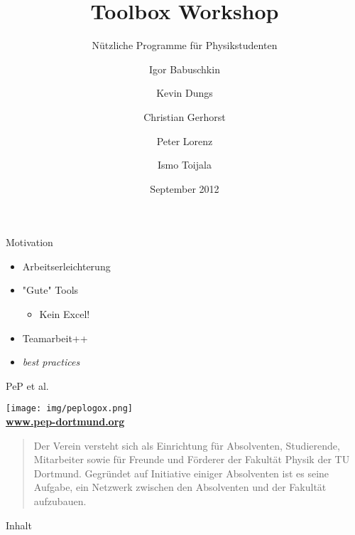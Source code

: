 \documentclass[t]{beamer}
\title{Toolbox Workshop}
\subtitle{Nützliche Programme für Physikstudenten}
\author[Igor B.\and Kevin D.\and Christian G.\and Peter L.\and Ismo T.]{
       Igor Babuschkin%
  \and Kevin Dungs%
  \and Christian Gerhorst%
  \and Peter Lorenz%
  \and Ismo Toijala%
}
\institute[PeP et al. e.V.]{PeP et al. e.V.\thanks{\href{http://pep-dortmund.org}{pep-dortmund.org}}}
\date{September 2012}
\begin{document}
  {
    \begin{frame}
      \titlepage
    \end{frame}
  }

  \begin{frame}{Motivation}
    \begin{itemize}
      \item Arbeitserleichterung
      \item "Gute" Tools \begin{itemize}
        \item Kein Excel!
      \end{itemize}
    \item Teamarbeit++
    \item \textit{best practices}
    \end{itemize}  
  \end{frame}

  \begin{frame}{PeP et al.}
    \begin{center}
      \texttt{[image: img/peplogox.png]} \\
      \color{TUgreen}\textbf{\href{http://pep-dortmund.org}{www.pep-dortmund.org}}
    \end{center}
    \begin{quote}
      \begin{spacing}{1.0}
        Der Verein versteht sich als Einrichtung für Absolventen, Studierende, Mitarbeiter sowie für Freunde und Förderer der Fakultät Physik der TU Dortmund. Gegründet auf Initiative einiger Absolventen ist es seine Aufgabe, ein Netzwerk zwischen den Absolventen und der Fakultät aufzubauen.
      \end{spacing}
    \end{quote}
  \end{frame}
  

  \begin{frame}{Inhalt}
    \tableofcontents[subsectionstyle=hide]
  \end{frame}

  
  
  
\end{document}
